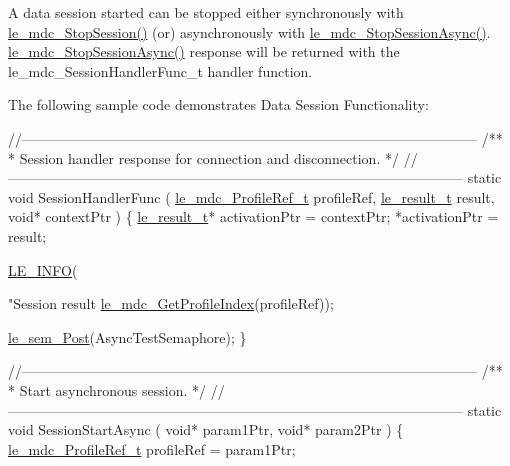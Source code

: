 A data session started can be stopped either synchronously with \hyperlink{le__mdc__interface_8h_a53453f85065c3cace0922150b7e3d869}{le\+\_\+mdc\+\_\+\+Stop\+Session()} (or) asynchronously with \hyperlink{le__mdc__interface_8h_ac5b357f7437c9e253fa17b2511fa14ef}{le\+\_\+mdc\+\_\+\+Stop\+Session\+Async()}. \hyperlink{le__mdc__interface_8h_ac5b357f7437c9e253fa17b2511fa14ef}{le\+\_\+mdc\+\_\+\+Stop\+Session\+Async()} response will be returned with the le\+\_\+mdc\+\_\+\+Session\+Handler\+Func\+\_\+t handler function.

The following sample code demonstrates Data Session Functionality\+: 
\begin{DoxyCodeInclude}
\textcolor{comment}{//--------------------------------------------------------------------------------------------------}\textcolor{comment}{}
\textcolor{comment}{/**}
\textcolor{comment}{ * Session handler response for connection and disconnection.}
\textcolor{comment}{ */}
\textcolor{comment}{//--------------------------------------------------------------------------------------------------}
\textcolor{keyword}{static} \textcolor{keywordtype}{void} SessionHandlerFunc
(
    \hyperlink{le__mdc__interface_8h_a91074d8f0d88c6645e3085dfadf87011}{le\_mdc\_ProfileRef\_t} profileRef,
    \hyperlink{le__basics_8h_a1cca095ed6ebab24b57a636382a6c86c}{le\_result\_t} result,
    \textcolor{keywordtype}{void}* contextPtr
)
\{
    \hyperlink{le__basics_8h_a1cca095ed6ebab24b57a636382a6c86c}{le\_result\_t}* activationPtr = contextPtr;
    *activationPtr = result;

    \hyperlink{le__log_8h_a23e6d206faa64f612045d688cdde5808}{LE\_INFO}(\textcolor{stringliteral}{"Session result %
      \hyperlink{le__mdc__interface_8h_a108f7c3db74a377c2ae5482543d4e0d9}{le\_mdc\_GetProfileIndex}(profileRef));

    \hyperlink{le__semaphore_8h_abb859411cc58fbcc576c986ef52083b2}{le\_sem\_Post}(AsyncTestSemaphore);
\}

\textcolor{comment}{//--------------------------------------------------------------------------------------------------}\textcolor{comment}{}
\textcolor{comment}{/**}
\textcolor{comment}{ * Start asynchronous session.}
\textcolor{comment}{ */}
\textcolor{comment}{//--------------------------------------------------------------------------------------------------}
\textcolor{keyword}{static} \textcolor{keywordtype}{void} SessionStartAsync
(
    \textcolor{keywordtype}{void}* param1Ptr,
    \textcolor{keywordtype}{void}* param2Ptr
)
\{
    \hyperlink{le__mdc__interface_8h_a91074d8f0d88c6645e3085dfadf87011}{le\_mdc\_ProfileRef\_t} profileRef = param1Ptr;

}
\end{DoxyCodeInclude}
